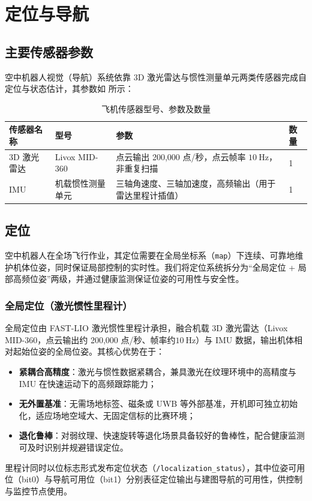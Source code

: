 \section{定位与导航}

\subsection{主要传感器参数}
空中机器人视觉（导航）系统依靠 3D 激光雷达与惯性测量单元两类传感器完成自定位与状态估计，其参数如 所示：

\begin{table}[hbtp!]
    \centering
    \begin{tabular}{ m{3cm}  m{4cm}  m{6cm} m{1cm}}
    \toprule
      传感器名称 & 型号 & 参数 & 数量 \\
        \midrule
        3D 激光雷达 & Livox MID-360 & 点云输出 200,000 点/秒，点云帧率 $\qty{10}{\Hz}$，非重复扫描 & 1 \\   
         \midrule
         IMU & 机载惯性测量单元 & 三轴角速度、三轴加速度，高频输出（用于雷达里程计插值） & 1 \\
    \toprule
    \end{tabular}
    \caption{飞机传感器型号、参数及数量}
    \label{tab:飞机传感器型号、参数及数量}
\end{table}

\subsection{定位}
空中机器人在全场飞行作业，其定位需要在全局坐标系（\lstinline{map}）下连续、可靠地维护机体位姿，同时保证局部控制的实时性。我们将定位系统拆分为“全局定位 + 局部高频位姿”两级，并通过健康监测保证位姿的可用性与安全性。

\subsubsection{全局定位（激光惯性里程计）}
全局定位由 FAST-LIO 激光惯性里程计承担，融合机载 3D 激光雷达（Livox MID-360，点云输出约 200{,}000 点/秒、帧率约$\qty{10}{\Hz}$）与 IMU 数据，输出机体相对起始位姿的全局位姿。其核心优势在于：
\begin{itemize}
    \item \textbf{紧耦合高精度}：激光与惯性数据紧耦合，兼具激光在纹理环境中的高精度与 IMU 在快速运动下的高频跟踪能力；
    \item \textbf{无外置基准}：无需场地标签、磁条或 UWB 等外部基准，开机即可独立初始化，适应场地空域大、无固定信标的比赛环境；
    \item \textbf{退化鲁棒}：对弱纹理、快速旋转等退化场景具备较好的鲁棒性，配合健康监测可及时识别并规避错误定位。
\end{itemize}
里程计同时以位标志形式发布定位状态（\lstinline{/localization_status}），其中位姿可用位（bit0）与导航可用位（bit1）分别表征定位输出与建图导航的可用性，供控制与监控节点使用。

